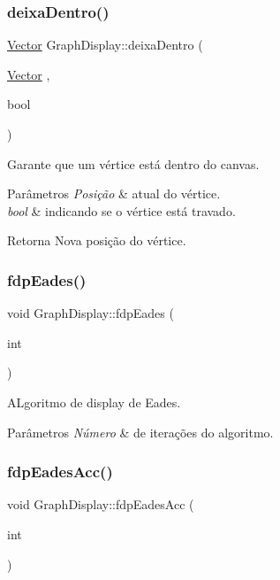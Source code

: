 \subsubsection{\texorpdfstring{deixa\+Dentro()}{deixaDentro()}}
{\footnotesize\ttfamily \hyperlink{classVector}{Vector} Graph\+Display\+::deixa\+Dentro (\begin{DoxyParamCaption}\item[{\hyperlink{classVector}{Vector}}]{,  }\item[{bool}]{ }\end{DoxyParamCaption})}

Garante que um vértice está dentro do canvas. 
\begin{DoxyParams}{Parâmetros}
{\em Posição} & atual do vértice. \\
\hline
{\em bool} & indicando se o vértice está travado. \\
\hline
\end{DoxyParams}
\begin{DoxyReturn}{Retorna}
Nova posição do vértice. 
\end{DoxyReturn}
\mbox{\label{classGraphDisplay_af709c8e4e8c0e270dbe5edcab2c8e350}} 
\subsubsection{\texorpdfstring{fdp\+Eades()}{fdpEades()}}
{\footnotesize\ttfamily void Graph\+Display\+::fdp\+Eades (\begin{DoxyParamCaption}\item[{int}]{ }\end{DoxyParamCaption})}

A\+Lgoritmo de display de Eades. 
\begin{DoxyParams}{Parâmetros}
{\em Número} & de iterações do algoritmo. \\
\hline
\end{DoxyParams}
\mbox{\label{classGraphDisplay_a982c8bb3e300720840a6e1fbd877f5ba}} 
\subsubsection{\texorpdfstring{fdp\+Eades\+Acc()}{fdpEadesAcc()}}
{\footnotesize\ttfamily void Graph\+Display\+::fdp\+Eades\+Acc (\begin{DoxyParamCaption}\item[{int}]{ }\end{DoxyParamCaption})}

